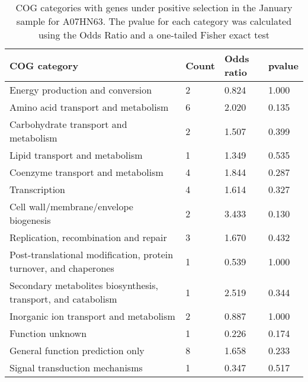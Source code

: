 \begin{table}[]
\footnotesize 
	\tabcolsep=0.11cm 
\caption{COG categories with genes under positive selection in the January sample for A07HN63. The pvalue for each category was calculated using the Odds Ratio and a one-tailed Fisher exact test} 
\begin{tabularx}{\textwidth}{L{6cm}R{2cm}R{2cm}R{2cm}} 
\hline 
\textbf{COG category} & \textbf{Count} & \textbf{Odds ratio} & \textbf{pvalue} \\ 
\hline 
Energy production and conversion & 2 & 0.824 & 1.000 \\ 
Amino acid transport and metabolism & 6 & 2.020 & 0.135 \\ 
Carbohydrate transport and metabolism & 2 & 1.507 & 0.399 \\ 
Lipid transport and metabolism & 1 & 1.349 & 0.535 \\ 
Coenzyme transport and metabolism & 4 & 1.844 & 0.287 \\ 
Transcription & 4 & 1.614 & 0.327 \\ 
Cell wall/membrane/envelope biogenesis & 2 & 3.433 & 0.130 \\ 
Replication, recombination and repair & 3 & 1.670 & 0.432 \\ 
Post-translational modification, protein turnover, and chaperones & 1 & 0.539 & 1.000 \\ 
Secondary metabolites biosynthesis, transport, and catabolism & 1 & 2.519 & 0.344 \\ 
Inorganic ion transport and metabolism & 2 & 0.887 & 1.000 \\ 
Function unknown & 1 & 0.226 & 0.174 \\ 
General function prediction only & 8 & 1.658 & 0.233 \\ 
Signal transduction mechanisms & 1 & 0.347 & 0.517 \\ 
\end{tabularx} 
\label{January_COG_Selection_A07HN63} 
 \end{table} 

